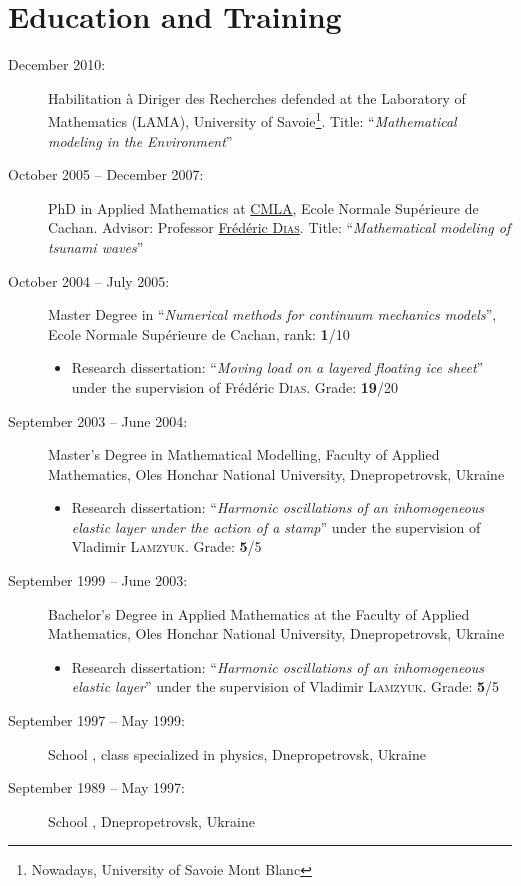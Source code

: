 \documentclass[final, a4paper, oneside, 12pt]{article}
\numberwithin{equation}{section}
\begin{document}

\section{Education and Training}

\begin{description}
  \item[December 2010:] Habilitation \`a Diriger des Recherches defended at the Laboratory of Mathematics (LAMA), University of Savoie\footnote{Nowadays, University of Savoie Mont Blanc}. Title: ``\textit{Mathematical modeling in the Environment}''
  
  \item[October 2005 -- December 2007:] PhD in Applied Mathematics at \href{http://www.cmla.ens-cachan.fr/}{CMLA}, Ecole Normale Sup\'erieure de Cachan. Advisor: Professor \href{http://www.cmla.ens-cachan.fr/Membres/dias}{Fr\'ed\'eric \textsc{Dias}}. Title: ``\textit{Mathematical modeling of tsunami waves}''
      
  \item[October 2004 -- July 2005:] Master Degree in ``\textit{Numerical methods for continuum mechanics models}'', Ecole Normale Sup\'erieure de Cachan, rank: \textbf{1}/10
  \begin{itemize}
     \item Research dissertation: ``\textit{Moving load on a layered floating ice sheet}'' under the supervision of Fr\'ed\'eric \textsc{Dias}. Grade: \textbf{19}/20
  \end{itemize}
      
  \item[September 2003 -- June 2004:] Master's Degree in Mathematical Modelling, Faculty of Applied Mathematics, Oles Honchar National University, Dnepropetrovsk, Ukraine
  \begin{itemize}
     \item Research dissertation: ``\textit{Harmonic oscillations of an inhomogeneous elastic layer under the action of a stamp}'' under the supervision of Vladimir \textsc{Lamzyuk}. Grade: \textbf{5}/5
  \end{itemize}
      
  \item[September 1999 -- June 2003:] Bachelor's Degree in Applied Mathematics at the Faculty of Applied Mathematics, Oles Honchar National University, Dnepropetrovsk, Ukraine
  \begin{itemize}
     \item Research dissertation: ``\textit{Harmonic oscillations of an inhomogeneous elastic layer}'' under the supervision of Vladimir \textsc{Lamzyuk}. Grade: \textbf{5}/5
  \end{itemize}
     
  \item[September 1997 -- May 1999:] School , class specialized in physics, Dnepropetrovsk, Ukraine
      
  \item[September 1989 -- May 1997:] School , Dnepropetrovsk, Ukraine
      
\end{description}
\end{document}
